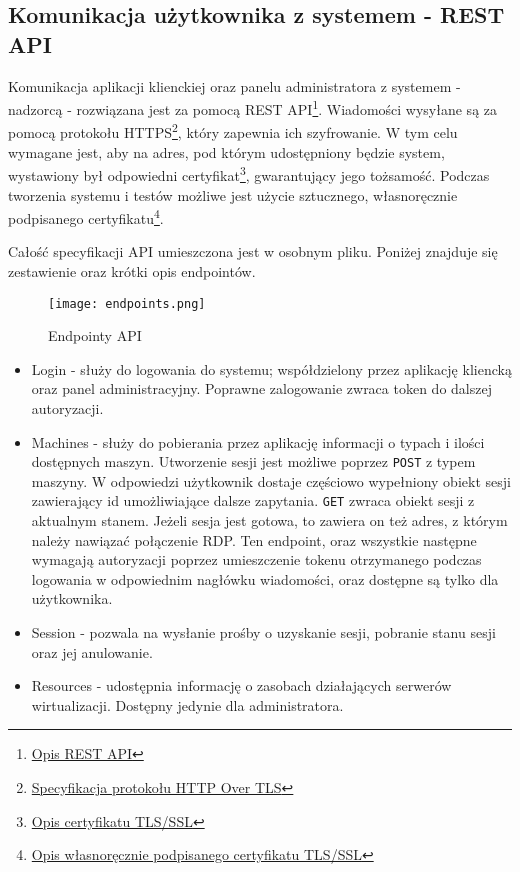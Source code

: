 \documentclass[../deliverable-two.tex]{subfiles}
\begin{document}
\label{communication}

\subsection{Komunikacja użytkownika z systemem - REST API}
\label{communication:api}

Komunikacja aplikacji klienckiej oraz panelu administratora z systemem - nadzorcą - rozwiązana jest za pomocą REST API\footnote{\href{https://restfulapi.net/}{Opis REST API}}. Wiadomości wysyłane są za pomocą protokołu HTTPS\footnote{\href{https://datatracker.ietf.org/doc/html/rfc2818}{Specyfikacja protokołu HTTP Over TLS}}, który zapewnia ich szyfrowanie. W tym celu wymagane jest, aby na adres, pod którym udostępniony będzie system, wystawiony był odpowiedni certyfikat\footnote{\href{https://protonmail.com/blog/tls-ssl-certificate/}{Opis certyfikatu TLS/SSL}}, gwarantujący jego tożsamość. Podczas tworzenia systemu i testów możliwe jest użycie sztucznego, własnoręcznie podpisanego certyfikatu\footnote{\href{https://aboutssl.org/what-is-self-sign-certificate/}{Opis własnoręcznie podpisanego certyfikatu TLS/SSL}}.

Całość specyfikacji API umieszczona jest w osobnym pliku. Poniżej znajduje się zestawienie oraz krótki opis endpointów.

\begin{figure}[H]
    \centering\texttt{[image: endpoints.png]}
    \caption{Endpointy API}
\end{figure}

\begin{itemize}
    \item Login - służy do logowania do systemu; współdzielony przez aplikację kliencką oraz panel administracyjny. Poprawne zalogowanie zwraca token do dalszej autoryzacji.
    \item Machines - służy do pobierania przez aplikację informacji o typach i ilości dostępnych maszyn. Utworzenie sesji jest możliwe poprzez \texttt{POST} z typem maszyny. W odpowiedzi użytkownik dostaje częściowo wypełniony obiekt sesji zawierający id umożliwiające dalsze zapytania. \texttt{GET} zwraca obiekt sesji z aktualnym stanem. Jeżeli sesja jest gotowa, to zawiera on też adres, z którym należy nawiązać połączenie RDP. Ten endpoint, oraz wszystkie następne wymagają autoryzacji poprzez umieszczenie tokenu otrzymanego podczas logowania w odpowiednim nagłówku wiadomości, oraz dostępne są tylko dla użytkownika.
    \item Session - pozwala na wysłanie prośby o uzyskanie sesji, pobranie stanu sesji oraz jej anulowanie.
    \item Resources - udostępnia informację o zasobach działających serwerów wirtualizacji. Dostępny jedynie dla administratora.
\end{itemize}
\end{document}
